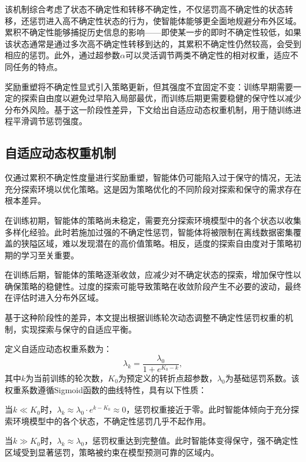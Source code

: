 该机制综合考虑了状态不确定性和转移不确定性，不仅惩罚高不确定性的状态转移，还惩罚进入高不确定性状态的行为，使智能体能够更全面地规避分布外区域。累积不确定性能够捕捉历史信息的影响——即使某一步的即时不确定性较低，如果该状态通常是通过多次高不确定性转移到达的，其累积不确定性仍然较高，会受到相应的惩罚。此外，通过超参数$\alpha$可以灵活调节两类不确定性的相对权重，适应不同任务的特点。

奖励重塑将不确定性显式引入策略更新，但其强度不宜固定不变：训练早期需要一定的探索自由度以避免过早陷入局部最优，而训练后期更需要稳健的保守性以减少分布外风险。基于这一阶段性差异，下文给出自适应动态权重机制，用于随训练进程平滑调节惩罚强度。

\subsection{自适应动态权重机制}\label{Sec3.2.4}



仅通过累积不确定性度量进行奖励重塑，智能体仍可能陷入过于保守的情况，无法充分探索环境以优化策略。这是因为策略优化的不同阶段对探索和保守的需求存在根本差异。

在训练初期，智能体的策略尚未稳定，需要充分探索环境模型中的各个状态以收集多样化经验。此时若施加过强的不确定性惩罚，智能体将被限制在离线数据密集覆盖的狭隘区域，难以发现潜在的高价值策略。相反，适度的探索自由度对于策略初期的学习至关重要。

在训练后期，智能体的策略逐渐收敛，应减少对不确定状态的探索，增加保守性以确保策略的稳健性。过度的探索可能导致策略在收敛阶段产生不必要的波动，最终在评估时进入分布外区域。

基于这种阶段性的差异，本文提出根据训练轮次动态调整不确定性惩罚权重的机制，实现探索与保守的自适应平衡。

定义自适应动态权重系数为：
\begin{equation}\label{Eq:Chap3_adaptive_weight}
  \lambda_k = \frac{\lambda_0}{1 + e^{K_0 - k}},
\end{equation}
其中$k$为当前训练的轮次数，$K_0$为预定义的转折点超参数，$\lambda_0$为基础惩罚系数。该权重系数遵循Sigmoid函数的曲线特性，具有以下性质：

当$k \ll K_0$时，$\lambda_k \approx \lambda_0 \cdot e^{k - K_0} \approx 0$，惩罚权重接近于零。此时智能体倾向于充分探索环境模型中的各个状态，不确定性惩罚几乎不起作用。

当$k \gg K_0$时，$\lambda_k \approx \lambda_0$，惩罚权重达到完整值。此时智能体变得保守，强不确定性区域受到显著惩罚，策略被约束在模型预测可靠的区域内。

